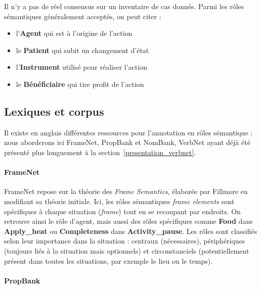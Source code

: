 Il n'y a pas de réel consensus sur un inventaire de cas donnés. Parmi les rôles
sémantiques généralement acceptés, on peut citer :

\begin{itemize}
    \item l'\textbf{Agent} qui est à l'origine de l'action
    \item le \textbf{Patient} qui subit un changement d'état
    \item l'\textbf{Instrument} utilisé pour réaliser l'action
    \item le \textbf{Bénéficiaire} qui tire profit de l'action
\end{itemize}

\subsection{Lexiques et corpus}


Il existe en anglais différentes ressources pour l'annotation en rôles
sémantique : nous aborderons ici FrameNet, PropBank et NomBank, VerbNet ayant
déjà été présenté plus longuement à la
section~\ref{presentation_verbnet}. 

\paragraph{FrameNet}
\label{presentation_framenet}


FrameNet \citep{baker1998berkeley} repose sur la théorie des \textit{Frame
Semantics}, élaborée par Fillmore en modifiant sa théorie initiale. Ici, les
rôles sémantiques \textit{frame elements} sont spécifiques à chaque situation
(\textit{frame}) tout en se recoupant par endroits. On retrouve ainsi le rôle
d'agent, mais aussi des rôles spécifiques comme \textbf{Food} dans
\textbf{Apply\_heat} ou \textbf{Completeness} dans \textbf{Activity\_pause}.
Les rôles sont classifiés selon leur importance dans la situation : centraux
(nécessaires), périphériques (toujours liés à la situation mais optionnels) et
circonstanciels (potentiellement présent dans toutes les situations, par
exemple le lieu ou le temps).

\paragraph{PropBank}

